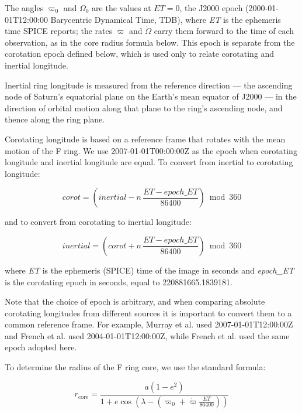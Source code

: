 The angles $\varpi_{0}$ and $\Omega_{0}$ are the values at $\mathit{ET} = 0$, the J2000 epoch (2000-01-01T12:00:00 Barycentric Dynamical Time, TDB), where \textit{ET} is the ephemeris time SPICE reports; the rates $\dot{\varpi}$ and $\dot{\Omega}$ carry them forward to the time of each observation, as in the core radius formula below. This epoch is separate from the corotation epoch defined below, which is used only to relate corotating and inertial longitude.

Inertial ring longitude is measured from the reference direction — the ascending node of Saturn’s equatorial plane on the Earth’s mean equator of J2000 — in the direction of orbital motion along that plane to the ring’s ascending node, and thence along the ring plane.

Corotating longitude is based on a reference frame that rotates with the mean motion of the F ring. We use 2007-01-01T00:00:00Z as the epoch when corotating longitude and inertial longitude are equal. To convert from inertial to corotating longitude:

\begin{equation*}\mathit{corot} = \left(\mathit{inertial} - n\,\frac{\mathit{ET} - \mathit{epoch\_ET}}{86400}\right) \bmod 360\end{equation*}

\noindent and to convert from corotating to inertial longitude:

\begin{equation*}\mathit{inertial} = \left(\mathit{corot} + n\,\frac{\mathit{ET} - \mathit{epoch\_ET}}{86400}\right) \bmod 360\end{equation*}

\noindent where \textit{ET} is the ephemeris (SPICE) time of the image in seconds and \textit{epoch\_\allowbreak{}ET} is the corotating epoch in seconds, equal to 220881665.1839181.

Note that the choice of epoch is arbitrary, and when comparing absolute corotating longitudes from different sources it is important to convert them to a common reference frame. For example, Murray et al.  used 2007-01-01T12:00:00Z and French et al.  used 2004-01-01T12:00:00Z, while French et al.  used the same epoch adopted here.

To determine the radius of the F ring core, we use the standard formula:

\begin{equation*}r_{\mathrm{core}}=\frac{a(1-e^{2})}{1+e\cos\left(\lambda-\left(\varpi_{0}+\dot{\varpi}\frac{\mathit{ET}}{86400}\right)\right)}\end{equation*}

